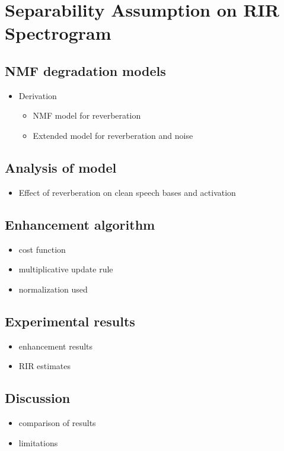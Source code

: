 \chapter{Separability Assumption on RIR Spectrogram}
\label{chapter:interspeech2018}

\section{NMF degradation models}
\begin{itemize}
\item Derivation
\begin{itemize}
\item NMF model for reverberation
\item Extended model for reverberation and noise
\end{itemize}
\end{itemize}
\section{Analysis of model}
\begin{itemize}
\item Effect of reverberation on clean speech bases and activation
\end{itemize}
\section{Enhancement algorithm}
\begin{itemize}
\item cost function
\item multiplicative update rule
\item normalization used 
\end{itemize}
\section{Experimental results}
\begin{itemize}
\item enhancement results
\item RIR estimates
\end{itemize}
\section{Discussion}
\begin{itemize}
\item comparison of results
\item limitations
\end{itemize}

